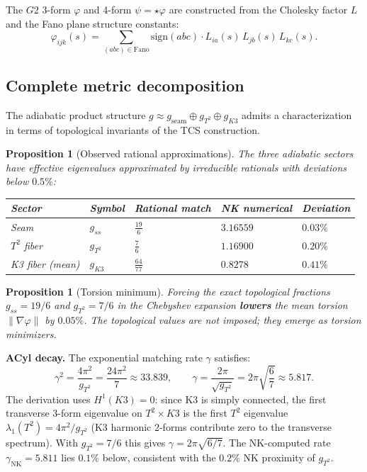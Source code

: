 \documentclass[11pt,a4paper]{article}
\newtheorem{proposition}[theorem]{Proposition}
\theoremstyle{definition}
\theoremstyle{remark}
\newcommand{\Gtwo}{\mathrm{G}_2}
\def\Gtwo{G2}%
\begin{document}
The $\Gtwo$ 3-form $\varphi$ and 4-form $\psi = \star\varphi$ are constructed from the Cholesky factor $L$ and the Fano plane structure constants:
\begin{equation}
\varphi_{ijk}(s) = \sum_{(abc) \in \mathrm{Fano}} \mathrm{sign}(abc) \cdot L_{ia}(s)\, L_{jb}(s)\, L_{kc}(s).
\end{equation}

\subsection{Complete metric decomposition}\label{sec:decomp}

The adiabatic product structure $g \approx g_{\mathrm{seam}} \oplus g_{T^2} \oplus g_{K3}$ admits a characterization in terms of topological invariants of the TCS construction.

\begin{proposition}[Observed rational approximations]\label{prop:F}
The three adiabatic sectors have effective eigenvalues approximated by irreducible rationals with deviations below $0.5\%$:
\begin{center}
\small
\begin{tabular}{lllll}
\toprule
Sector & Symbol & Rational match & NK numerical & Deviation \\
\midrule
Seam & $g_{ss}$ & $\frac{19}{6}$ & $3.16559$ & $0.03\%$ \\
$T^2$ fiber & $g_{T^2}$ & $\frac{7}{6}$ & $1.16900$ & $0.20\%$ \\
K3 fiber (mean) & $g_{K3}$ & $\frac{64}{77}$ & $0.8278$ & $0.41\%$ \\
\bottomrule
\end{tabular}
\end{center}
\end{proposition}

\begin{proposition}[Torsion minimum]\label{prop:G}
Forcing the exact topological fractions $g_{ss} = 19/6$ and $g_{T^2} = 7/6$ in the Chebyshev expansion \textbf{lowers} the mean torsion $\|\nabla\varphi\|$ by $0.05\%$. The topological values are not imposed; they emerge as torsion minimizers.
\end{proposition}

\textbf{ACyl decay.} The exponential matching rate $\gamma$ satisfies:
\begin{equation}
\gamma^2 = \frac{4\pi^2}{g_{T^2}} = \frac{24\pi^2}{7} \approx 33.839, \qquad \gamma = \frac{2\pi}{\sqrt{g_{T^2}}} = 2\pi\sqrt{\frac{6}{7}} \approx 5.817.
\end{equation}
The derivation uses $H^1(K3) = 0$: since K3 is simply connected, the first transverse 3-form eigenvalue on $T^2 \times K3$ is the first $T^2$ eigenvalue $\lambda_1(T^2) = 4\pi^2/g_{T^2}$ (K3 harmonic 2-forms contribute zero to the transverse spectrum). With $g_{T^2} = 7/6$ this gives $\gamma = 2\pi\sqrt{6/7}$. The NK-computed rate $\gamma_{\mathrm{NK}} = 5.811$ lies $0.1\%$ below, consistent with the $0.2\%$ NK proximity of $g_{T^2}$.
\end{document}
